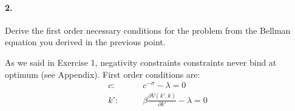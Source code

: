 \documentclass[dvipsnames,11pt]{article}
\begin{document}
\paragraph{2.} Derive the first order necessary conditions for the problem from the Bellman equation you derived in the previous point.  
\begin{solution}
    As we said in Exercise 1, negativity constraints constraints never bind at optimum (see Appendix). First order conditions are:
    \begin{align}
        c: \qquad &c^{-\sigma}-\lambda=0 \label{focC}\\
        k': \qquad &\beta \frac{\partial V(k',k)}{\partial k'}-\lambda=0 \label{focK}
    \end{align}
\end{solution}
\end{document}
